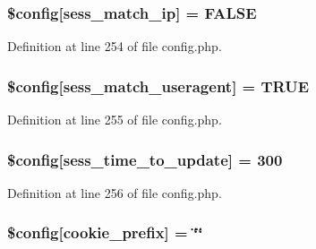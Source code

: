 \subsubsection[{\texorpdfstring{\$config}{$config}}]{\setlength{\rightskip}{0pt plus 5cm}\$config\mbox{[}\textquotesingle{}sess\+\_\+match\+\_\+ip\textquotesingle{}\mbox{]} = F\+A\+L\+SE}\hypertarget{ci_2application_2config_2config_8php_aed449d12f2854249e5f7229fafb269b2}{}\label{ci_2application_2config_2config_8php_aed449d12f2854249e5f7229fafb269b2}


Definition at line 254 of file config.\+php.

\subsubsection[{\texorpdfstring{\$config}{$config}}]{\setlength{\rightskip}{0pt plus 5cm}\$config\mbox{[}\textquotesingle{}sess\+\_\+match\+\_\+useragent\textquotesingle{}\mbox{]} = T\+R\+UE}\hypertarget{ci_2application_2config_2config_8php_a90a66e41bce1a62ff818c4f0e3aa09d2}{}\label{ci_2application_2config_2config_8php_a90a66e41bce1a62ff818c4f0e3aa09d2}


Definition at line 255 of file config.\+php.

\subsubsection[{\texorpdfstring{\$config}{$config}}]{\setlength{\rightskip}{0pt plus 5cm}\$config\mbox{[}\textquotesingle{}sess\+\_\+time\+\_\+to\+\_\+update\textquotesingle{}\mbox{]} = 300}\hypertarget{ci_2application_2config_2config_8php_afb6a66c470a9c08b90efcbc6c5594573}{}\label{ci_2application_2config_2config_8php_afb6a66c470a9c08b90efcbc6c5594573}


Definition at line 256 of file config.\+php.

\subsubsection[{\texorpdfstring{\$config}{$config}}]{\setlength{\rightskip}{0pt plus 5cm}\$config\mbox{[}\textquotesingle{}cookie\+\_\+prefix\textquotesingle{}\mbox{]} = \char`\"{}\char`\"{}}\hypertarget{ci_2application_2config_2config_8php_ae5f35eb62ffdcfa1878ed13fa47b2d5d}{}\label{ci_2application_2config_2config_8php_ae5f35eb62ffdcfa1878ed13fa47b2d5d}


